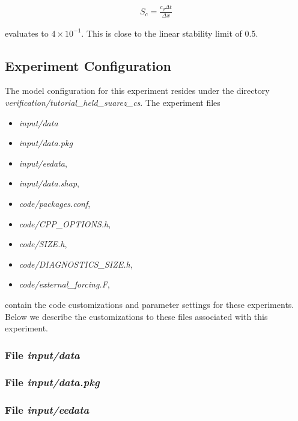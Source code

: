 \begin{eqnarray}
\label{EQ:eg-hs-gfl_stability}
S_{c} = \frac{c_{g} \Delta t}{ \Delta x}
\end{eqnarray}

\noindent evaluates to $4 \times 10^{-1}$. This is close to the linear
stability limit of 0.5.
  
\subsection{Experiment Configuration}
\label{www:tutorials}
\label{SEC:eg-hs_examp_exp_config}

The model configuration for this experiment resides under the 
directory {\it verification/tutorial\_held\_suarez\_cs}.  The experiment files 
\begin{itemize}
\item {\it input/data}
\item {\it input/data.pkg}
\item {\it input/eedata},
\item {\it input/data.shap},
\item {\it code/packages.conf},
\item {\it code/CPP\_OPTIONS.h},
\item {\it code/SIZE.h},
\item {\it code/DIAGNOSTICS\_SIZE.h},
\item {\it code/external\_forcing.F},
\end{itemize}
contain the code customizations and parameter settings for these
experiments. Below we describe the customizations
to these files associated with this experiment.

\subsubsection{File {\it input/data}}
\label{www:tutorials}



\subsubsection{File {\it input/data.pkg}}
\label{www:tutorials}



\subsubsection{File {\it input/eedata}}
\label{www:tutorials}

